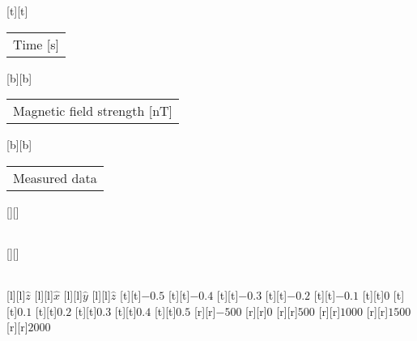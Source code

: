 %
%
[t][t]{\fontsize{8}{12}\selectfont \setlength{\tabcolsep}{0pt}\begin{tabular}{c}Time [s]\end{tabular}}%
[b][b]{\fontsize{8}{12}\selectfont \setlength{\tabcolsep}{0pt}\begin{tabular}{c}Magnetic field strength [nT]\end{tabular}}%
[b][b]{\fontsize{8}{12}\selectfont \setlength{\tabcolsep}{0pt}\begin{tabular}{c}Measured data\end{tabular}}%
[][]{\fontsize{8}{12}\selectfont \setlength{\tabcolsep}{0pt}\begin{tabular}{c} \end{tabular}}%
[][]{\fontsize{8}{12}\selectfont \setlength{\tabcolsep}{0pt}\begin{tabular}{c} \end{tabular}}%
[l][l]{\fontsize{6}{8}\selectfont $\hat{z}$}%
[l][l]{\fontsize{6}{8}\selectfont $\hat{x}$}%
[l][l]{\fontsize{6}{8}\selectfont $\hat{y}$}%
[l][l]{\fontsize{6}{8}\selectfont $\hat{z}$}%
%
\fontsize{6}{8}%
\selectfont%
%
[t][t]{$-0.5$}%
[t][t]{$-0.4$}%
[t][t]{$-0.3$}%
[t][t]{$-0.2$}%
[t][t]{$-0.1$}%
[t][t]{$0$}%
[t][t]{$0.1$}%
[t][t]{$0.2$}%
[t][t]{$0.3$}%
[t][t]{$0.4$}%
[t][t]{$0.5$}%
%
[r][r]{$-500$}%
[r][r]{$0$}%
[r][r]{$500$}%
[r][r]{$1000$}%
[r][r]{$1500$}%
[r][r]{$2000$}%
%
%
